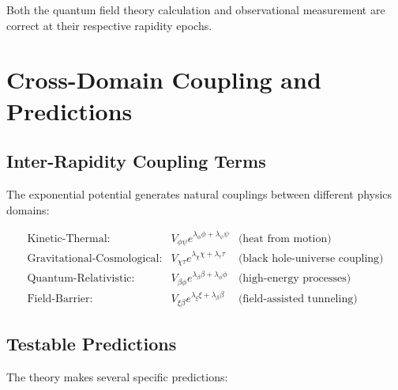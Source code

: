 \documentclass[12pt,a4paper]{article}
\begin{document}
Both the quantum field theory calculation and observational measurement are 
correct at their respective rapidity epochs.

\section{Cross-Domain Coupling and Predictions}

\subsection{Inter-Rapidity Coupling Terms}

The exponential potential generates natural couplings between different physics 
domains:

\begin{align}
\text{Kinetic-Thermal:}             & V _ { \phi \psi } e ^ { \lambda _ { \phi } \phi + \lambda _ { \psi } \psi }   & \text{(heat from motion)} \\
\text{Gravitational-Cosmological:}  & V _ { \chi \tau}  e ^ { \lambda _{ \chi } \chi + \lambda _ { \tau } \tau}     & \text{(black hole-universe coupling)} \\
\text{Quantum-Relativistic:} \quad  & V _ { \beta \phi} e ^ { \lambda _{ \beta } \beta + \lambda _ { \phi } \phi}   & \text{(high-energy processes)} \\
\text{Field-Barrier:}               & V _ { \xi \beta } e ^ { \lambda _{ \xi } \xi + \lambda _ { \beta } \beta}     & \text{(field-assisted tunneling)}
\end{align}

\subsection{Testable Predictions}

The theory makes several specific predictions:
\end{document}
